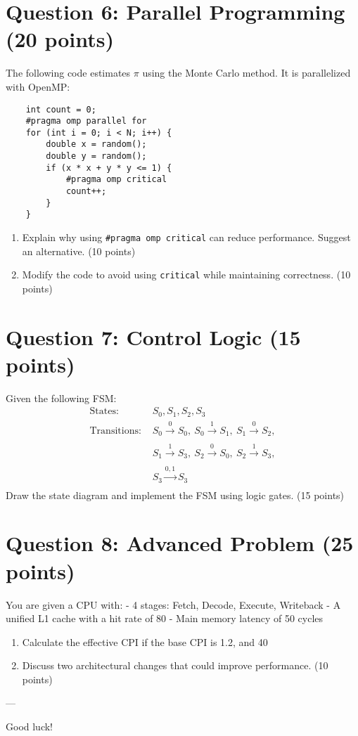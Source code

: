 \documentclass[11pt]{article}
\begin{document}
\section*{Question 6: Parallel Programming (20 points)}
The following code estimates \(\pi\) using the Monte Carlo method. It is parallelized with OpenMP:
\begin{verbatim}
    int count = 0;
    #pragma omp parallel for
    for (int i = 0; i < N; i++) {
        double x = random();
        double y = random();
        if (x * x + y * y <= 1) {
            #pragma omp critical
            count++;
        }
    }
\end{verbatim}
\begin{enumerate}[label=\textbf{Q6.\arabic*}]
    \item Explain why using \texttt{\#pragma omp critical} can reduce performance. Suggest an alternative. (10 points)
    \item Modify the code to avoid using \texttt{critical} while maintaining correctness. (10 points)
\end{enumerate}

\section*{Question 7: Control Logic (15 points)}
Given the following FSM:
\[
\begin{aligned}
\text{States: } & S_0, S_1, S_2, S_3 \\
\text{Transitions: } & S_0 \xrightarrow[]{0} S_0, \ S_0 \xrightarrow[]{1} S_1, \ S_1 \xrightarrow[]{0} S_2, \\
                    & S_1 \xrightarrow[]{1} S_3, \ S_2 \xrightarrow[]{0} S_0, \ S_2 \xrightarrow[]{1} S_3, \\
                    & S_3 \xrightarrow[]{0, 1} S_3
\end{aligned}
\]
Draw the state diagram and implement the FSM using logic gates. (15 points)

\section*{Question 8: Advanced Problem (25 points)}
You are given a CPU with:
- 4 stages: Fetch, Decode, Execute, Writeback
- A unified L1 cache with a hit rate of 80%
- Main memory latency of 50 cycles

\begin{enumerate}[label=\textbf{Q8.\arabic*}]
    \item Calculate the effective CPI if the base CPI is 1.2, and 40%
    \item Discuss two architectural changes that could improve performance. (10 points)
\end{enumerate}

---

Good luck!
\end{document}
